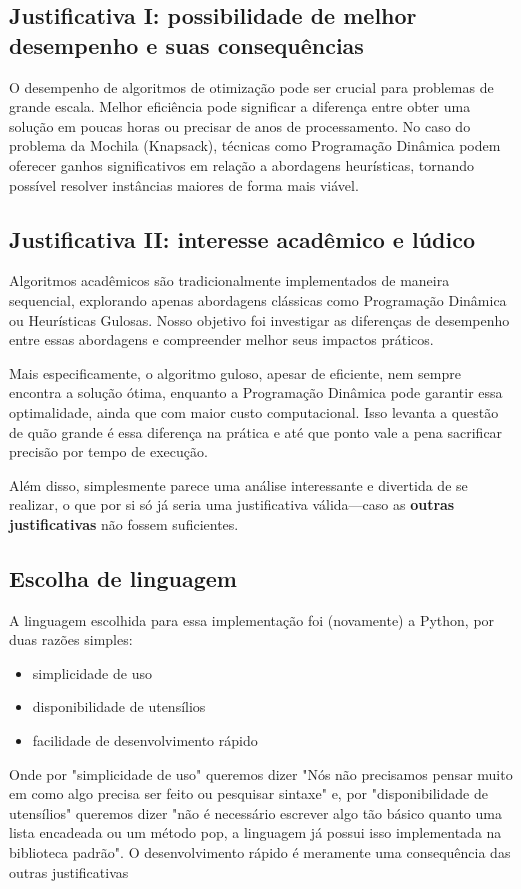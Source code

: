 \documentclass{article}
\begin{document}
\subsection{Justificativa I: possibilidade de melhor desempenho e suas consequências}
O desempenho de algoritmos de otimização pode ser crucial para problemas de grande escala. Melhor eficiência pode significar a diferença entre obter uma solução em poucas horas ou precisar de anos de processamento. No caso do problema da Mochila (Knapsack), técnicas como Programação Dinâmica podem oferecer ganhos significativos em relação a abordagens heurísticas, tornando possível resolver instâncias maiores de forma mais viável.

\subsection{Justificativa II: interesse acadêmico e lúdico}
Algoritmos acadêmicos são tradicionalmente implementados de maneira sequencial, explorando apenas abordagens clássicas como Programação Dinâmica ou Heurísticas Gulosas. Nosso objetivo foi investigar as diferenças de desempenho entre essas abordagens e compreender melhor seus impactos práticos.

Mais especificamente, o algoritmo guloso, apesar de eficiente, nem sempre encontra a solução ótima, enquanto a Programação Dinâmica pode garantir essa optimalidade, ainda que com maior custo computacional. Isso levanta a questão de quão grande é essa diferença na prática e até que ponto vale a pena sacrificar precisão por tempo de execução.

Além disso, simplesmente parece uma análise interessante e divertida de se realizar, o que por si só já seria uma justificativa válida—caso as \textbf{outras justificativas} não fossem suficientes.


\subsection{Escolha de linguagem}
A linguagem escolhida para essa implementação foi (novamente) a Python, por duas razões simples:
\begin{itemize}
    \item simplicidade de uso
    \item disponibilidade de utensílios
    \item facilidade de desenvolvimento rápido
\end{itemize}
Onde por "simplicidade de uso" queremos dizer "Nós não precisamos pensar muito em como algo precisa ser feito ou pesquisar sintaxe" e, por "disponibilidade de utensílios" queremos dizer "não é necessário escrever algo tão básico quanto uma lista encadeada ou um método pop, a linguagem já possui isso implementada na biblioteca padrão". O desenvolvimento rápido é meramente uma consequência das outras justificativas\\
\end{document}
